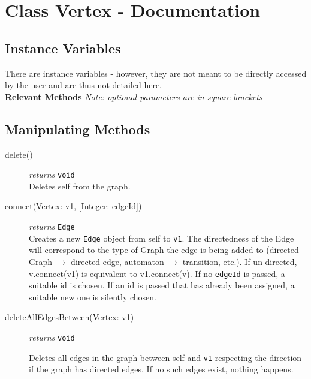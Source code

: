 \documentclass{article}
\newlength\q
\begin{document}
\section{Class Vertex - Documentation}

\subsection{Instance Variables}
There are instance variables - however, they are not meant to be directly accessed by the user and are thus not detailed here.\\

\textbf{{\large Relevant Methods}}
\textit{Note: optional parameters are in square brackets}
\subsection{Manipulating Methods}
\begin{description}
\item[delete()] \emph{returns} \texttt{void}\\
Deletes self from the graph.

\item[connect(Vertex: v1, {[Integer: edgeId]})] \emph{returns} \texttt{Edge}\\
Creates a new \texttt{Edge} object from self to \texttt{v1}. The directedness of the Edge will correspond to the type of Graph the edge is being added to (directed Graph $\to$ directed edge, automaton $\to$ transition, etc.). If un-directed, v.connect(v1) is equivalent to v1.connect(v). If no \texttt{edgeId}
is passed, a suitable id is chosen. If an id is passed that has
already been assigned, a suitable new one is silently chosen.

\item[deleteAllEdgesBetween(Vertex: v1)] \emph{returns}
\texttt{void}

Deletes all edges in the graph
between self and \texttt{v1} respecting
the direction if the graph has directed edges.
If no such edges exist, nothing happens.


\end{description}
\end{document}
